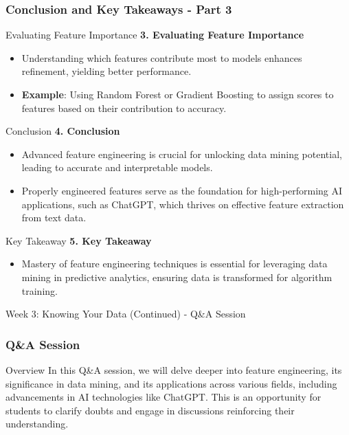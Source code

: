 \documentclass[aspectratio=169]{beamer}
\begin{document}
\begin{frame}[fragile]
    \frametitle{Conclusion and Key Takeaways - Part 3}
    
    \begin{block}{Evaluating Feature Importance}
        \textbf{3. Evaluating Feature Importance}
    \end{block}
    
    \begin{itemize}
        \item Understanding which features contribute most to models enhances refinement, yielding better performance.
        \item \textbf{Example}: Using Random Forest or Gradient Boosting to assign scores to features based on their contribution to accuracy.
    \end{itemize}

    \begin{block}{Conclusion}
        \textbf{4. Conclusion}
    \end{block}
    \begin{itemize}
        \item Advanced feature engineering is crucial for unlocking data mining potential, leading to accurate and interpretable models.
        \item Properly engineered features serve as the foundation for high-performing AI applications, such as ChatGPT, which thrives on effective feature extraction from text data.
    \end{itemize}
    
    \begin{block}{Key Takeaway}
        \textbf{5. Key Takeaway}
    \end{block}
    \begin{itemize}
        \item Mastery of feature engineering techniques is essential for leveraging data mining in predictive analytics, ensuring data is transformed for algorithm training.
    \end{itemize}
\end{frame}

\begin{frame}[fragile]{Week 3: Knowing Your Data (Continued) - Q\&A Session}
    \frametitle{Q\&A Session}
    \begin{block}{Overview}
        In this Q\&A session, we will delve deeper into feature engineering, its significance in data mining, and its applications across various fields, including advancements in AI technologies like ChatGPT. This is an opportunity for students to clarify doubts and engage in discussions reinforcing their understanding.
    \end{block}
\end{frame}
\end{document}
